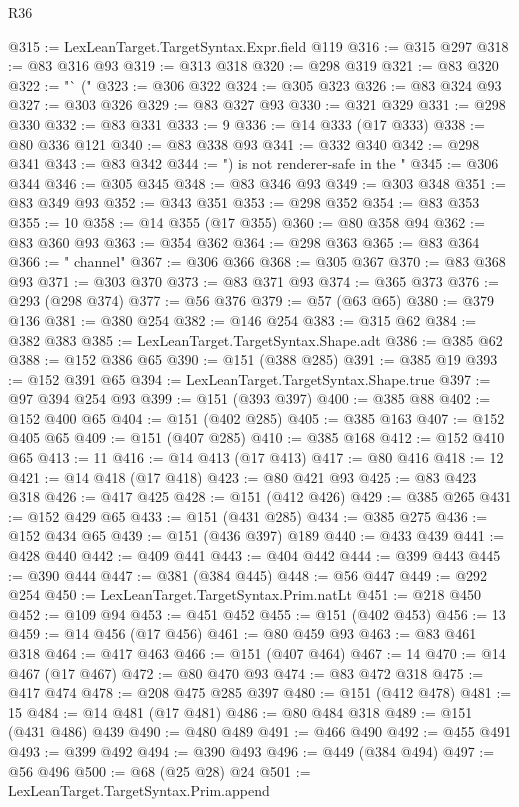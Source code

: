 \begin{lexlean}{R36}
\begin{coremodule}
@315 := LexLeanTarget.TargetSyntax.Expr.field @119
@316 := @315 @297
@318 := @83 @316 @93
@319 := @313 @318
@320 := @298 @319
@321 := @83 @320
@322 := "` ("
@323 := @306 @322
@324 := @305 @323
@326 := @83 @324 @93
@327 := @303 @326
@329 := @83 @327 @93
@330 := @321 @329
@331 := @298 @330
@332 := @83 @331
@333 := 9
@336 := @14 @333 (@17 @333)
@338 := @80 @336 @121
@340 := @83 @338 @93
@341 := @332 @340
@342 := @298 @341
@343 := @83 @342
@344 := ") is not renderer-safe in the "
@345 := @306 @344
@346 := @305 @345
@348 := @83 @346 @93
@349 := @303 @348
@351 := @83 @349 @93
@352 := @343 @351
@353 := @298 @352
@354 := @83 @353
@355 := 10
@358 := @14 @355 (@17 @355)
@360 := @80 @358 @94
@362 := @83 @360 @93
@363 := @354 @362
@364 := @298 @363
@365 := @83 @364
@366 := " channel"
@367 := @306 @366
@368 := @305 @367
@370 := @83 @368 @93
@371 := @303 @370
@373 := @83 @371 @93
@374 := @365 @373
@376 := @293 (@298 @374)
@377 := @56 @376
@379 := @57 (@63 @65)
@380 := @379 @136
@381 := @380 @254
@382 := @146 @254
@383 := @315 @62
@384 := @382 @383
@385 := LexLeanTarget.TargetSyntax.Shape.adt
@386 := @385 @62
@388 := @152 @386 @65
@390 := @151 (@388 @285)
@391 := @385 @19
@393 := @152 @391 @65
@394 := LexLeanTarget.TargetSyntax.Shape.true
@397 := @97 @394 @254 @93
@399 := @151 (@393 @397)
@400 := @385 @88
@402 := @152 @400 @65
@404 := @151 (@402 @285)
@405 := @385 @163
@407 := @152 @405 @65
@409 := @151 (@407 @285)
@410 := @385 @168
@412 := @152 @410 @65
@413 := 11
@416 := @14 @413 (@17 @413)
@417 := @80 @416
@418 := 12
@421 := @14 @418 (@17 @418)
@423 := @80 @421 @93
@425 := @83 @423 @318
@426 := @417 @425
@428 := @151 (@412 @426)
@429 := @385 @265
@431 := @152 @429 @65
@433 := @151 (@431 @285)
@434 := @385 @275
@436 := @152 @434 @65
@439 := @151 (@436 @397) @189
@440 := @433 @439
@441 := @428 @440
@442 := @409 @441
@443 := @404 @442
@444 := @399 @443
@445 := @390 @444
@447 := @381 (@384 @445)
@448 := @56 @447
@449 := @292 @254
@450 := LexLeanTarget.TargetSyntax.Prim.natLt
@451 := @218 @450
@452 := @109 @94
@453 := @451 @452
@455 := @151 (@402 @453)
@456 := 13
@459 := @14 @456 (@17 @456)
@461 := @80 @459 @93
@463 := @83 @461 @318
@464 := @417 @463
@466 := @151 (@407 @464)
@467 := 14
@470 := @14 @467 (@17 @467)
@472 := @80 @470 @93
@474 := @83 @472 @318
@475 := @417 @474
@478 := @208 @475 @285 @397
@480 := @151 (@412 @478)
@481 := 15
@484 := @14 @481 (@17 @481)
@486 := @80 @484 @318
@489 := @151 (@431 @486) @439
@490 := @480 @489
@491 := @466 @490
@492 := @455 @491
@493 := @399 @492
@494 := @390 @493
@496 := @449 (@384 @494)
@497 := @56 @496
@500 := @68 (@25 @28) @24
@501 := LexLeanTarget.TargetSyntax.Prim.append

\end{coremodule}
\end{lexlean}
